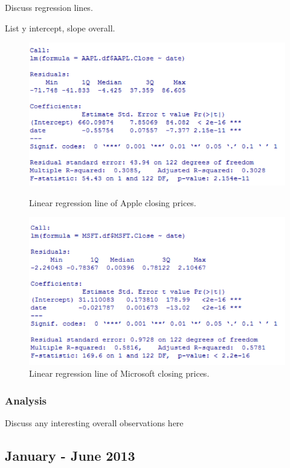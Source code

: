 \documentclass[paper=a4, fontsize=11pt]{scrartcl} %
\numberwithin{equation}{section} %
\numberwithin{figure}{section} %
\numberwithin{table}{section} %
\begin{document}
Discuss regression lines. 

List y intercept, slope overall. 

\begin{figure}[!htb]
  \includegraphics[width=\linewidth]{graph/aapl_reg_4.png}
  \caption{Linear regression line of Apple closing prices.}
\endminipage\hfill
{}
  \includegraphics[width=\linewidth]{graph/msft_reg_4.png}
  \caption{Linear regression line of Microsoft closing prices.}
\endminipage\hfill
\end{figure}


\subsubsection{Analysis}
Discuss any interesting overall observations here


\subsection{January - June  2013 }
\end{document}
